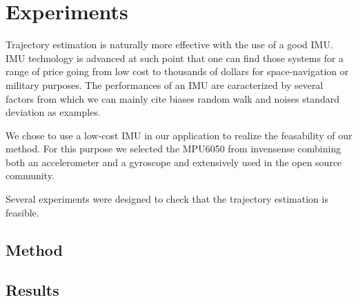 
\section{Experiments} \label{sec:experiments}

Trajectory estimation is naturally more effective with the use of a good IMU. IMU technology is advanced at such point that 
one can find those systems for a range of price going from low cost to thousands of dollars for space-navigation or military purposes.
The performances of an IMU are caracterized by several factors from which we can mainly cite biases random walk and noises standard deviation
as examples.

We chose to use a low-cost IMU in our application to realize the feasability of our method. For this purpose we selected the 
MPU6050 from invensense combining both an accelerometer and a gyroscope and extensively used in the open source community.

Several experiments were designed to check that the trajectory estimation is feasible.

\subsection{Method}

\subsection{Results}